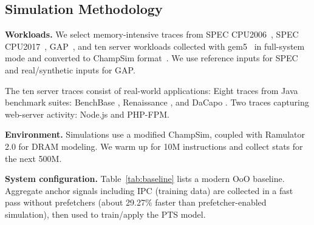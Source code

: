 \documentclass[conference]{IEEEtran}
\begin{document}
\subsection{Simulation Methodology}
\label{subsec:expsetup}
\textbf{Workloads.} We select memory-intensive traces from SPEC CPU2006~\cite{spec2006}, SPEC CPU2017~\cite{spec2017}, GAP~\cite{beamer2017gapbenchmarksuite}, and ten server workloads collected with gem5~\cite{gem52011} in full-system mode and converted to ChampSim format~\cite{llbp_workloads}. We use reference inputs for SPEC and real/synthetic inputs for GAP.

The ten server traces consist of real-world applications: Eight traces from Java benchmark suites: BenchBase \cite{oltp_bench}, Renaissance \cite{java_renaissance}, and DaCapo \cite{java_dacapo}. Two traces capturing web-server activity: Node.js and PHP-FPM.

\textbf{Environment.} Simulations use a modified ChampSim\cite{ChampSim}, coupled with Ramulator 2.0\cite{luo2023ramulator20modernmodular} for DRAM modeling. We warm up for 10M instructions and collect stats for the next 500M.

\textbf{System configuration.} Table~\ref{tab:baseline} lists a modern OoO baseline. Aggregate anchor signals including IPC (training data) are collected in a fast pass without prefetchers (about 29.27\% faster than prefetcher-enabled simulation), then used to train/apply the PTS model.
\end{document}

